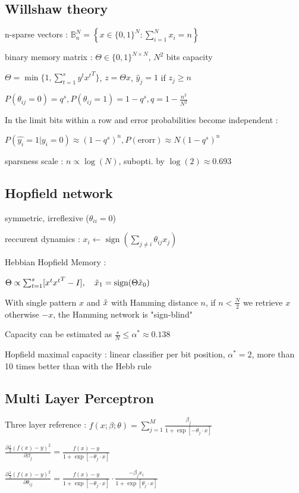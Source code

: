 \documentclass[a2paper,4pt]{extarticle}
\newcommand{\B}{\mathbb{B}}
\DeclareMathOperator{\sign}{sign}
\begin{document}
\begin{landscape}
\begin{multicols*}{7}
\subsection{Willshaw theory}

n-sparse vectors : $\B_n^N =
\left\{
x \in \{ 0,1 \}^N : \sum_{i=1}^N x_i = n
\right\}$

binary memory matrix : $\Theta \in \{0, 1\}^{N \times N}$, $N^2$ bits capacity

$\Theta = \min \{1, \sum_{t=1}^s y^t {x^t}^T \}$, $z = \Theta x$, $\hat{y}_j = 1$ if $z_j \geq n$

$P(\theta_{i j} = 0) = q^s, P(\theta_{i j} = 1) = 1 - q^s,
q = 1 - \frac{n^2}{N^2}$

In the limit bits within a row and error probabilities become independent : 

$
P(\hat{y_i} = 1 | y_i = 0 ) \approx (1 - q^s)^n,
P(\text{erorr}) \approx N(1 - q^s)^n
$

sparsness scale : $n \propto \log(N)$, subopti. by $\log(2) \approx 0.693$

\subsection{Hopfield network}

symmetric, irreflexive ($\theta_{ii} = 0$)

reccurent dynamics : $x_i \leftarrow \sign \left( \sum_{j \neq i} \theta_{i j} x_j \right) $

Hebbian Hopfield Memory : 

$\Theta \propto \sum_{t=1}^s [x^t {x^t}^T - I], \quad
\Tilde{x}_1 = \sign(\Theta \Tilde{x}_0)$

With single pattern $x$ and $\Tilde{x}$ with Hamming distance $n$, if $n < \frac{N}{2}$ we retrieve $x$ otherwise $-x$, the Hamming network is "sign-blind"

Capacity can be estimated as $\frac{s}{N} \leq \alpha^* \approx 0.138 $

Hopfield maximal capacity :
linear classifier per bit position, $\alpha^* = 2$, more than 10 times better than with the Hebb rule

\subsection{Multi Layer Perceptron}

Three layer reference :
$
f(x;\beta;\theta) =
\sum_{j=1}^M \frac{\beta_j}{1 + \exp[-\theta_j \cdot x]}
$

$
\frac{\partial \frac{1}{2} (f(x) -y)^2 }{\partial \beta_j} = 
\frac{f(x) - y}{1 + \exp[-\theta_j \cdot x]}
$

$
\frac{\partial \frac{1}{2} (f(x) -y)^2 }{\partial \theta_{i j}} = 
\frac{f(x) - y}{1 + \exp[-\theta_j \cdot x]} \cdot
\frac{-\beta_j x_i}{1 + \exp[\theta_j \cdot x]}
$



\end{multicols*}
\end{landscape}
\end{document}
